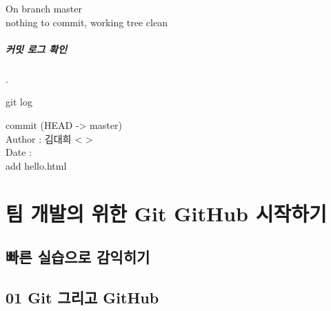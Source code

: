 \documentclass[12pt, a4paper, oneside]{book}
\let\stdsection\section
\renewcommand\section{\newpage\stdsection}
\begin{document}
		\begin{tcolorbox}
			On branch master \\
			nothing to commit, working tree clean
		\end{tcolorbox}


\paragraph{커밋 로그 확인}
		.\\

			\begin{tcolorbox}		[
									title=커밋 로그 확인
									]
									git log
			\end{tcolorbox}

		\begin{tcolorbox}
			commit (HEAD -> master) \\
			Author : 김대희 < >\\
			Date : 			\\
			add hello.html
		\end{tcolorbox}




%

	\chapter {팀 개발의 위한 Git GitHub 시작하기}
	\noptcrule

	\minitoc

%	
	\section 	{빠른 실습으로 감익히기}

%	
	\section 	{01 Git 그리고 GitHub}
		
\end{document}
